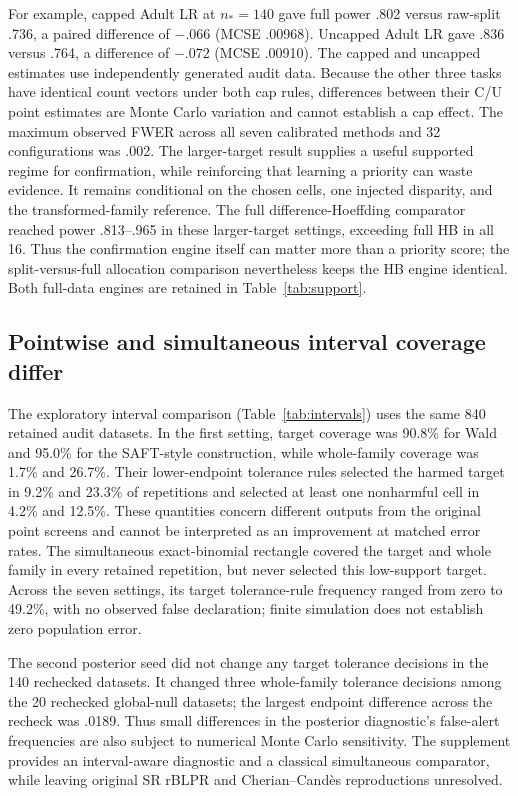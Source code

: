 \documentclass[Afour,sageh,times,doublespace]{sagej}
\begin{document}
For example, capped Adult LR at $n_*=140$ gave full power .802 versus raw-split .736, a paired difference of $-.066$ (MCSE .00968). Uncapped Adult LR gave .836 versus .764, a difference of $-.072$ (MCSE .00910). The capped and uncapped estimates use independently generated audit data. Because the other three tasks have identical count vectors under both cap rules, differences between their C/U point estimates are Monte Carlo variation and cannot establish a cap effect. The maximum observed FWER across all seven calibrated methods and 32 configurations was .002. The larger-target result supplies a useful supported regime for confirmation, while reinforcing that learning a priority can waste evidence. It remains conditional on the chosen cells, one injected disparity, and the transformed-family reference. The full difference-Hoeffding comparator reached power .813--.965 in these larger-target settings, exceeding full HB in all 16. Thus the confirmation engine itself can matter more than a priority score; the split-versus-full allocation comparison nevertheless keeps the HB engine identical. Both full-data engines are retained in Table~\ref{tab:support}.

\par

\subsection{Pointwise and simultaneous interval coverage differ}
The exploratory interval comparison (Table~\ref{tab:intervals}) uses the same 840 retained audit datasets. In the first setting, target coverage was 90.8\% for Wald and 95.0\% for the SAFT-style construction, while whole-family coverage was 1.7\% and 26.7\%. Their lower-endpoint tolerance rules selected the harmed target in 9.2\% and 23.3\% of repetitions and selected at least one nonharmful cell in 4.2\% and 12.5\%. These quantities concern different outputs from the original point screens and cannot be interpreted as an improvement at matched error rates. The simultaneous exact-binomial rectangle covered the target and whole family in every retained repetition, but never selected this low-support target. Across the seven settings, its target tolerance-rule frequency ranged from zero to 49.2\%, with no observed false declaration; finite simulation does not establish zero population error.

The second posterior seed did not change any target tolerance decisions in the 140 rechecked datasets. It changed three whole-family tolerance decisions among the 20 rechecked global-null datasets; the largest endpoint difference across the recheck was .0189. Thus small differences in the posterior diagnostic's false-alert frequencies are also subject to numerical Monte Carlo sensitivity. The supplement provides an interval-aware diagnostic and a classical simultaneous comparator, while leaving original SR rBLPR and Cherian--Cand\`es reproductions unresolved.
\end{document}
